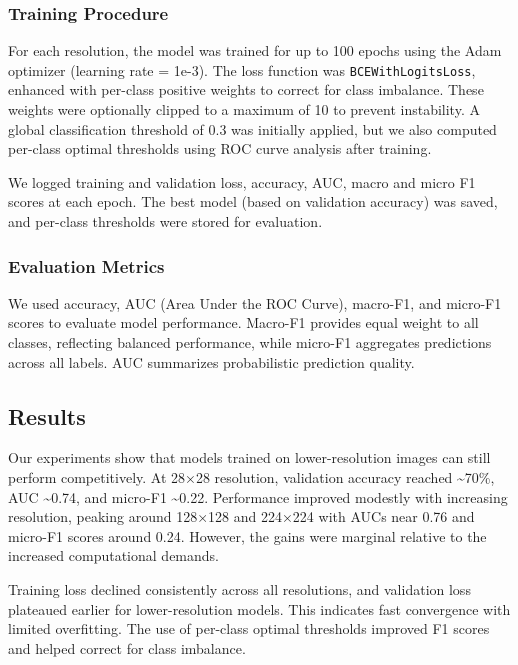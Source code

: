 \documentclass[
]{article}
\begin{document}
\subsubsection{Training Procedure}\label{training-procedure}

For each resolution, the model was trained for up to 100 epochs using
the Adam optimizer (learning rate = 1e-3). The loss function was
\texttt{BCEWithLogitsLoss}, enhanced with per-class positive weights to
correct for class imbalance. These weights were optionally clipped to a
maximum of 10 to prevent instability. A global classification threshold
of 0.3 was initially applied, but we also computed per-class optimal
thresholds using ROC curve analysis after training.

We logged training and validation loss, accuracy, AUC, macro and micro
F1 scores at each epoch. The best model (based on validation accuracy)
was saved, and per-class thresholds were stored for evaluation.

\subsubsection{Evaluation Metrics}\label{evaluation-metrics}

We used accuracy, AUC (Area Under the ROC Curve), macro-F1, and micro-F1
scores to evaluate model performance. Macro-F1 provides equal weight to
all classes, reflecting balanced performance, while micro-F1 aggregates
predictions across all labels. AUC summarizes probabilistic prediction
quality.

\subsection{Results}\label{results}

Our experiments show that models trained on lower-resolution images can
still perform competitively. At 28×28 resolution, validation accuracy
reached \textasciitilde70\%, AUC \textasciitilde0.74, and micro-F1
\textasciitilde0.22. Performance improved modestly with increasing
resolution, peaking around 128×128 and 224×224 with AUCs near 0.76 and
micro-F1 scores around 0.24. However, the gains were marginal relative
to the increased computational demands.

Training loss declined consistently across all resolutions, and
validation loss plateaued earlier for lower-resolution models. This
indicates fast convergence with limited overfitting. The use of
per-class optimal thresholds improved F1 scores and helped correct for
class imbalance.
\end{document}
